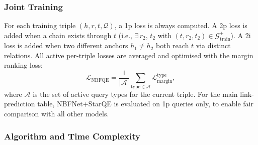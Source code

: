 \documentclass[10pt,journal,compsoc]{IEEEtran}
\begin{document}
\subsubsection{Joint Training}
\label{sssec:nbfqe_train}

For each training triple $(h, r, t, \mathcal{Q})$,
a 1p loss is always computed.
A 2p loss is added when a chain exists
through $t$ (i.e., $\exists\, r_2,\, t_2$ with
$(t, r_2, t_2) \in \mathcal{G}^{+}_{\mathrm{train}}$).
A 2i loss is added when two different anchors
$h_1 \neq h_2$ both reach $t$ via distinct relations.
All active per-triple losses are averaged and optimised
with the margin ranking loss:
\begin{equation}
  \mathcal{L}_{\mathrm{NBFQE}}
  = \frac{1}{|\mathcal{A}|}
    \sum_{\mathrm{type} \in \mathcal{A}}
    \mathcal{L}_{\mathrm{margin}}^{\mathrm{type}},
  \label{eq:nbfqe_loss}
\end{equation}
where $\mathcal{A}$ is the set of active query types
for the current triple.
For the main link-prediction table,
NBFNet+StarQE is evaluated on 1p queries only,
to enable fair comparison with all other models.

\subsubsection{Algorithm and Time Complexity}
\label{sssec:nbfqe_complexity}
\end{document}
